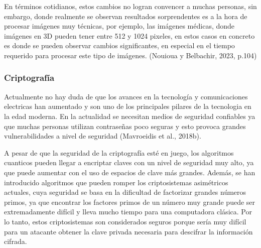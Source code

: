 \documentclass{article}
\begin{document}
En términos cotidianos, estos cambios no logran convencer a muchas personas, sin embargo, donde realmente se observan resultados sorprendentes es a la hora de procesar imágenes muy técnicas, por ejemplo, las imágenes médicas, donde imágenes en 3D pueden tener entre 512 y 1024 pixeles, en estos casos en concreto es donde se pueden observar cambios significantes, en especial en el tiempo requerido para procesar este tipo de imágenes. (Nouioua y Belbachir, 2023, p.104)

\subsubsection{Criptografía}
Actualmente no hay duda de que los avances en la tecnología y comunicaciones electricas han aumentado y son uno de los principales pilares de la tecnologia en la edad moderna. En la actualidad se necesitan medios de seguridad confiables ya que muchas personas utilizan contraseñas poco seguras y esto provoca grandes vulnerabilidades a nivel de seguridad (Mavroeidis et al., 2018b).

A pesar de que la seguridad de la criptografía esté en juego, los algoritmos cuanticos pueden llegar a encriptar claves con un nivel de seguridad muy alto, ya que puede aumentar con el uso de espacios de clave más grandes. Además, se han introducido algoritmos que pueden romper los criptosistemas asimétricos actuales, cuya seguridad se basa en la dificultad de factorizar grandes números primos, ya que encontrar los factores primos de un número muy grande puede ser extremadamente difícil y lleva mucho tiempo para una computadora clásica. Por lo tanto, estos criptosistemas son considerados seguros porque sería muy difícil para un atacante obtener la clave privada necesaria para descifrar la información cifrada.
\end{document}
